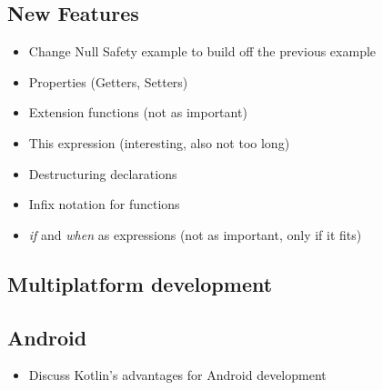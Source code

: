 \documentclass[a4paper, 11pt]{article}
\begin{document}
  \subsection{New Features}
    \begin{itemize}
      \item Change Null Safety example to build off the previous example
      \item Properties (Getters, Setters)
      \item Extension functions (not as important)
      \item This expression (interesting, also not too long)
      \item Destructuring declarations
      \item Infix notation for functions
      \item \textit{if} and \textit{when} as expressions (not as important, only if it fits)
    \end{itemize}

  \subsection{Multiplatform development}
  
  \subsection{Android}
    \begin{itemize}
      \item Discuss Kotlin's advantages for Android development
    \end{itemize}
\end{document}
